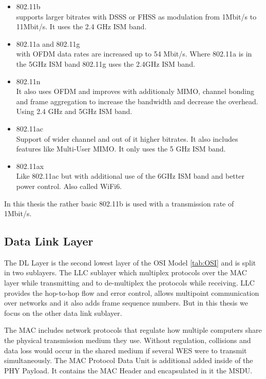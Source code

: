 \begin{itemize}
	\item 802.11b \\
	supports larger bitrates with \ac{DSSS} or \ac{FHSS} as modulation from 1Mbit/s to 11Mbit/s.
	It uses the 2.4 GHz ISM band.
	\item 802.11a and 802.11g \\
	with \ac{OFDM} data rates are increased up to 54 Mbit/s.
	Where 802.11a is in the 5GHz ISM band 802.11g uses the 2.4GHz ISM band.
	\item 802.11n\\
	It also uses \ac{OFDM} and improves with additionaly \ac{MIMO}, channel bonding and frame aggregation to increase the bandwidth and decrease the overhead.
	Using 2.4 GHz and 5GHz ISM band.
	\item 802.11ac\\
	Support of wider channel and out of it higher bitrates. It also includes features like Multi-User MIMO.
	It only uses the 5 GHz ISM band.
	\item 802.11ax\\
	Like 802.11ac but with additional use of the 6GHz ISM band and better power control. 
	Also called WiFi6.
\end{itemize}

In this thesis the rather basic 802.11b is used with a transmission rate of 1Mbit/s.

\subsection*{Data Link Layer}

The \ac{DL} Layer is the second lowest layer of the \ac{OSI} Model \ref{tab:OSI} and is split in two sublayers. 
The \ac{LLC} sublayer which multiplex protocols over the MAC layer while transmitting and to de-multiplex the protocols while receiving.
LLC provides the hop-to-hop flow and error control, allows multipoint communication over networks 
and it also adds frame sequence numbers.
But in this thesis we focus on the other data link sublayer.

The \ac{MAC} includes network protocols that regulate how multiple computers share the physical transmission medium they use. 
Without regulation, collisions and data loss would occur in the shared medium if several WES were to transmit simultaneously.
The \ac{MAC} Protocol Data Unit is additional added inside of the \ac{PHY} Payload. 
It contains the \ac{MAC} Header and encapsulated in it the \ac{MSDU}.

